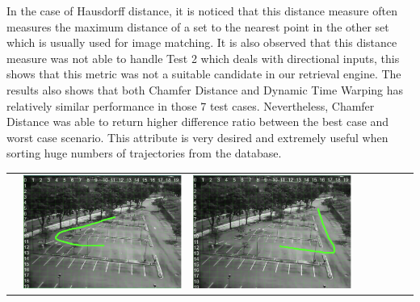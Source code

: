 In the case of Hausdorff distance, it is noticed that this distance measure often measures the maximum distance of a set to the nearest point in the other set which is usually used for image matching. It is also observed that this distance measure was not able to handle Test 2 which deals with directional inputs, this shows that this metric was not a suitable candidate in our retrieval engine.
The results also shows that both Chamfer Distance and Dynamic Time Warping has relatively similar performance in those 7 test cases. Nevertheless, Chamfer Distance was able to return higher difference ratio between the best case and worst case scenario. This attribute is very desired and extremely useful when sorting huge numbers of trajectories from the database.



\begin{table}[]
\begin{tabular}{llllllll}
 & \includegraphics{image/suppResults/q1.PNG}
 & \includegraphics{image/suppResults/q2.PNG}

\end{tabular}
\end{table}
